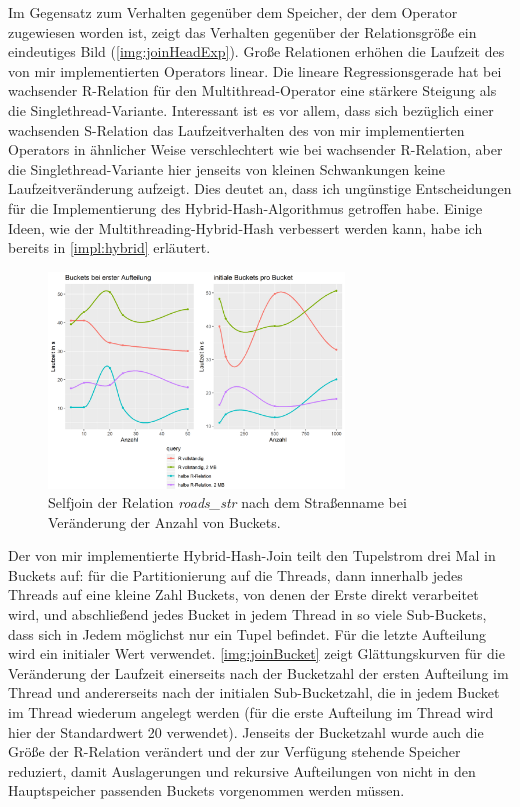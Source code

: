 \documentclass[a4paper,12pt,twoside]{article}
\newcommand{\Fb}[1]{\textit{#1}} %
\begin{document}
Im Gegensatz zum Verhalten gegenüber dem Speicher, der dem Operator zugewiesen worden ist, zeigt das Verhalten gegenüber der Relationsgröße ein eindeutiges Bild (\autoref{img:joinHeadExp}). Große Relationen erhöhen die Laufzeit des von mir implementierten Operators linear. Die lineare Regressionsgerade hat bei wachsender R-Relation für den Multithread-Operator eine stärkere Steigung als die Singlethread-Variante. Interessant ist es vor allem, dass sich bezüglich einer wachsenden S-Relation das Laufzeitverhalten des von mir implementierten Operators in ähnlicher Weise verschlechtert wie bei wachsender R-Relation, aber die Singlethread-Variante hier jenseits von kleinen Schwankungen keine Laufzeitveränderung aufzeigt. Dies deutet an, dass ich ungünstige Entscheidungen für die Implementierung des Hybrid-Hash-Algorithmus getroffen habe. Einige Ideen, wie der Multithreading-Hybrid-Hash verbessert werden kann, habe ich bereits in \autoref{impl:hybrid} erläutert.   

\begin{figure}
	\centering
	\includegraphics[width=0.70\textwidth]{Bilder/join_bucket.png}
	\caption{Selfjoin der Relation \Fb{roads\_str} nach dem Straßenname bei Veränderung der Anzahl von Buckets.}
	\label{img:joinBucket}
\end{figure}

Der von mir implementierte Hybrid-Hash-Join teilt den Tupelstrom drei Mal in Buckets auf: für die Partitionierung auf die Threads, dann innerhalb jedes Threads auf eine kleine Zahl Buckets, von denen der Erste direkt verarbeitet wird, und abschließend jedes Bucket in jedem Thread in so viele Sub-Buckets, dass sich in Jedem möglichst nur ein Tupel befindet. Für die letzte Aufteilung wird ein initialer Wert verwendet. \autoref{img:joinBucket} zeigt Glättungskurven für die Veränderung der Laufzeit einerseits nach der Bucketzahl der ersten Aufteilung im Thread und andererseits nach der initialen Sub-Bucketzahl, die in jedem Bucket im Thread wiederum angelegt werden (für die erste Aufteilung im Thread wird hier der Standardwert 20 verwendet). Jenseits der Bucketzahl wurde auch die Größe der R-Relation verändert und der zur Verfügung stehende Speicher reduziert, damit Auslagerungen und rekursive Aufteilungen von nicht in den Hauptspeicher passenden Buckets vorgenommen werden müssen.
\end{document}
